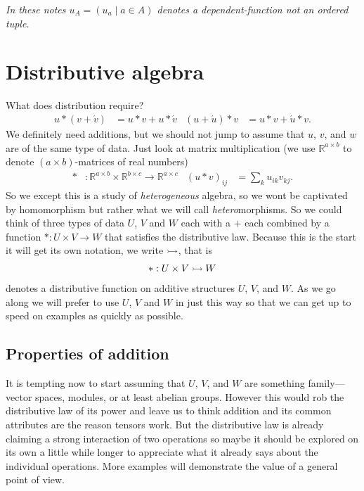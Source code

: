 \emph{In these notes $u_A=(u_a\mid a\in A)$ denotes a dependent-function not an ordered tuple.}

\section{Distributive algebra}


What does distribution require?
\begin{align}
    u*(v+\acute{v}) & = u*v+u*\acute{v}
    & 
    (u+\acute{u})*v & = u*v + \acute{u}*v.
\end{align}
We definitely need additions, but we should not jump to assume that $u$, $v$, and $w$ are 
of the same type of data.  Just look at  matrix 
multiplication (we use $\mathbb{R}^{a\times b}$ to denote $(a\times b)$-matrices 
of real numbers)
\begin{align*}
    *&:\mathbb{R}^{a\times b}\times \mathbb{R}^{b\times c}\to \mathbb{R}^{a\times c}
    &
    (u*v)_{ij} & = \sum_k u_{ik}v_{kj}.
\end{align*}
So we except this is a study of \emph{heterogeneous} algebra, so we wont be
captivated by homomorphism but rather what we will call \emph{hetero}morphisms.
So we could think of three types of data $U$, $V$ and $W$ each with a $+$ each
combined by a function 
$*:U\times V\to W$
that satisfies the distributive law.  Because this is the start it will get its own 
notation, we write $\rightarrowtail$, that is 
\begin{align*}
    *:U\times V\rightarrowtail W
\end{align*}
denotes a distributive function on additive structures $U$, $V$, and $W$.
As we go along we will prefer to use $U$, $V$ and $W$ in just this way so that 
we can get up to speed on examples as quickly as possible.


\subsection{Properties of addition}
It is tempting now to start  assuming that $U$, $V$, and $W$ are 
something family---vector spaces, modules, or at least abelian groups.
However this would rob the distributive law of its power and leave us to think 
addition and its common attributes are the reason tensors work.  But the 
distributive law is already claiming a strong interaction of two operations 
so maybe it should be explored on its own a little while longer to appreciate 
what it already says about the individual operations.  More examples will demonstrate 
the value of a general point of view.

